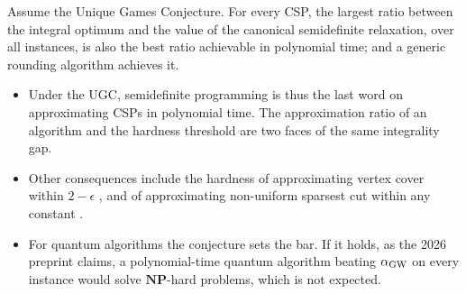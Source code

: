 \documentclass[handoutsbeamer.tex]{subfiles}
\begin{document}
\begin{frame}
\onp{\footnotesize}
\begin{thm}
Assume the Unique Games Conjecture. For every CSP, the largest ratio between the integral optimum and the value of the canonical semidefinite relaxation, over all instances, is also the best ratio achievable in polynomial time; and a generic rounding algorithm achieves it.
\end{thm}
\begin{itemize}\setlength\itemsep{0.25em}
    \item Under the UGC, semidefinite programming is thus the last word on approximating CSPs in polynomial time. The approximation ratio of an algorithm and the hardness threshold are two faces of the same integrality gap.
    \item Other consequences include the hardness of approximating vertex cover within $2-\epsilon$ \citep{khot2008vertex}, and of approximating non-uniform sparsest cut within any constant \citep{khot2015unique}.
    \item For quantum algorithms the conjecture sets the bar. If it holds, as the 2026 preprint claims, a polynomial-time quantum algorithm beating $\alpha_{\rm GW}$ on every instance would solve $\mathbf{NP}$-hard problems, which is not expected.
\end{itemize}
\end{frame}
\end{document}
